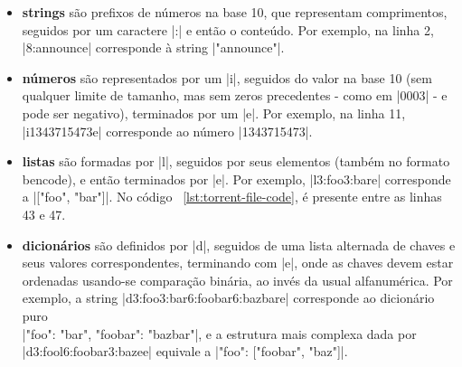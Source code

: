 \begin{itemize}
    \item \textbf{\glspl*{string}} são prefixos de números na base 10, que representam
        comprimentos, seguidos por um caractere \bverb|:| e então o conteúdo. Por
        exemplo, na linha 2, \bverb|8:announce| corresponde à \gls*{string}
        \sverb|"announce"|.

    \item \textbf{números} são representados por um \bverb|i|, seguidos do valor na
        base 10 (sem qualquer limite de tamanho, mas sem zeros precedentes - como em
        \bverb|0003| - e pode ser negativo), terminados por um \bverb|e|. Por exemplo,
        na linha 11, \bverb|i1343715473e| corresponde ao número \sverb|1343715473|.

    \item \textbf{listas} são formadas por \bverb|l|, seguidos por seus elementos
        (também no formato \gls*{bencode}), e então terminados por \bverb|e|. Por
        exemplo, \bverb|l3:foo3:bare| corresponde a \sverb|["foo", "bar"]|. No código
        ~\ref{lst:torrent-file-code}, é presente entre as linhas 43 e 47.

    \item \textbf{dicionários} são definidos por \bverb|d|, seguidos de uma lista
        alternada de chaves e seus valores correspondentes, terminando com \bverb|e|,
        onde as chaves devem estar ordenadas usando-se comparação binária, ao invés da
        usual alfanumérica. Por exemplo, a \gls*{string}
        \bverb|d3:foo3:bar6:foobar6:bazbare| corresponde ao dicionário puro \\
        \sverb|{"foo": "bar", "foobar": "bazbar"}|, e a estrutura mais complexa dada por
        \\ \bverb|d3:fool6:foobar3:bazee| equivale a \sverb|{"foo": ["foobar", "baz"]}|.
\end{itemize}

